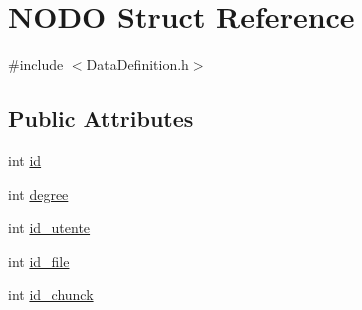 \hypertarget{structNODO}{\section{N\-O\-D\-O Struct Reference}
\label{structNODO}
}


{\ttfamily \#include $<$Data\-Definition.\-h$>$}

\subsection*{Public Attributes}
\begin{DoxyCompactItemize}
\item 
int \hyperlink{structNODO_a363311f2eac0f019bb559decee9d283a}{id}
\item 
int \hyperlink{structNODO_ac347f94dfc5042c7a35b5a2ae30796c3}{degree}
\item 
int \hyperlink{structNODO_a3d58b6fffbdc9fa4dd781d6e5d775ce5}{id\-\_\-utente}
\item 
int \hyperlink{structNODO_ad1f3355d97fd04e0d908dc196bbf07af}{id\-\_\-file}
\item 
int \hyperlink{structNODO_afff09f10bea60ea56ef2ee708a876017}{id\-\_\-chunck}
\end{DoxyCompactItemize}


